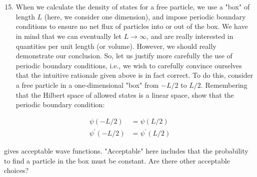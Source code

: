 \documentclass[12pt]{article}
\begin{document}
\section{}
\begin{enumerate}
  \setcounter{enumi}{14}
  \item When we calculate the density of states for a free particle, we use a "box" of length $L$ (here, we consider one dimension), and impose periodic boundary conditions to ensure no net flux of particles into or out of the box. We have in mind that we can eventually let $L \rightarrow \infty$, and are really interested in quantities per unit length (or volume). However, we should really demonstrate our conclusion. So, let us justify more carefully the use of periodic boundary conditions, i.e., we wish to carefully convince ourselves that the intuitive rationale given above is in fact correct. To do this, consider a free particle in a one-dimensional "box" from $-L / 2$ to $L / 2$. Remembering that the Hilbert space of allowed states is a linear space, show that the periodic boundary condition:
\end{enumerate}

$$
\begin{aligned}
\psi(-L / 2) & =\psi(L / 2) \\
\psi^{\prime}(-L / 2) & =\psi^{\prime}(L / 2)
\end{aligned}
$$

gives acceptable wave functions. "Acceptable" here includes that the probability to find a particle in the box must be constant. Are there other acceptable choices?
\end{document}

